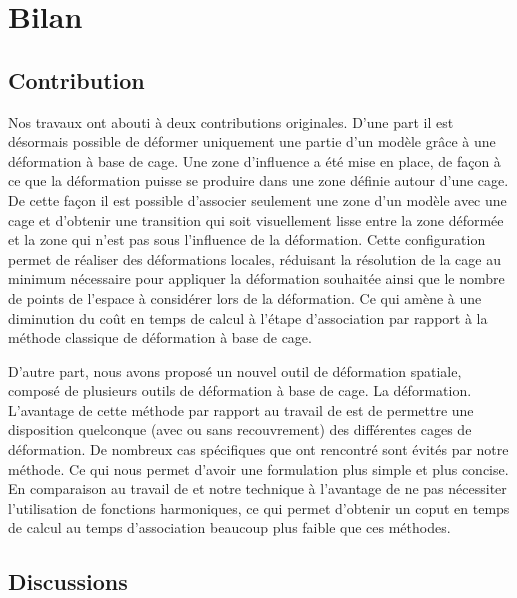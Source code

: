 
\def\baselinestretch{1}
\chapter{Bilan}
\ifpdf
\graphicspath{{Conclusions/ConclusionsFigs/PNG/}{Conclusions/ConclusionsFigs/PDF/}{Conclusions/ConclusionsFigs/}}
\else
\graphicspath{{Conclusions/ConclusionsFigs/EPS/}{Conclusions/ConclusionsFigs/}}
\fi

\section{Contribution}

Nos travaux ont abouti à deux contributions originales. D'une part il est
désormais possible de déformer uniquement une partie d'un modèle grâce à une
déformation à base de cage. Une zone d'influence a été mise en place, de façon
à ce que la déformation puisse se produire dans une zone définie autour d'une
cage. De cette façon il est possible d'associer seulement une zone d'un modèle
avec une cage et d'obtenir une transition qui soit visuellement lisse entre la
zone déformée et la zone qui n'est pas sous l'influence de la déformation.
Cette configuration permet de réaliser des déformations locales, réduisant la
résolution de la cage au minimum nécessaire pour appliquer la déformation
souhaitée ainsi que le nombre de points de l'espace à considérer lors de la
déformation. Ce qui amène à une diminution du coût en temps de calcul à
l'étape d'association par rapport à la méthode classique de déformation à base
de cage.

D'autre part, nous avons proposé un nouvel outil de déformation spatiale,
composé de plusieurs outils de déformation à base de cage. La déformation.
L'avantage de cette méthode par rapport au travail de \cite{GPCP13} est de
permettre une disposition quelconque (avec ou sans recouvrement) des
différentes cages de déformation. De nombreux cas spécifiques que
\cite{GPCP13} ont rencontré sont évités par notre méthode. Ce qui nous permet
d'avoir une formulation plus simple et plus concise. En comparaison au travail
de \cite{JBPS11} et \cite{GPCP13} notre technique à l'avantage de ne pas
nécessiter l'utilisation de fonctions harmoniques, ce qui permet d'obtenir un
coput en temps de calcul au temps d'association beaucoup plus faible que ces
méthodes.

\section{Discussions}

